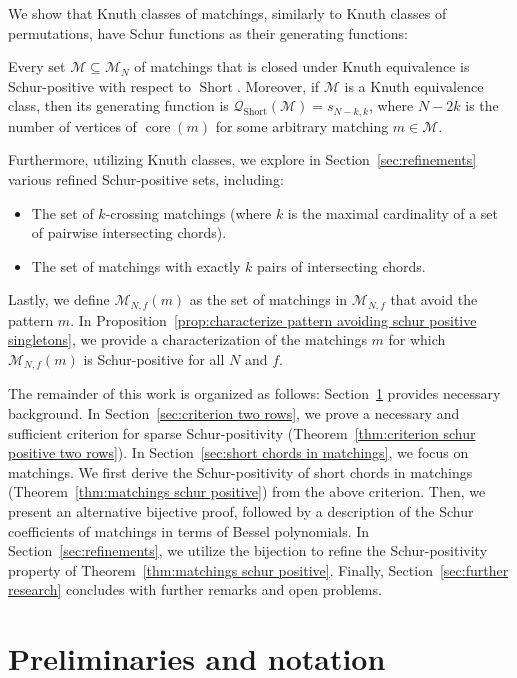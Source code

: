 \documentclass[ALCO]{cedram}
\newcommand{\Short}{\operatorname{Short}}
\newcommand{\core}{\operatorname{core}}
\newcommand{\Q}{\mathcal{Q}}
\newcommand{\M}{\mathcal{M}}
\begin{document}
We show that Knuth classes of matchings, similarly to Knuth classes of permutations, have Schur functions as their generating functions:

\begin{theorem}
    Every set $\M \subseteq \M_N$ of matchings that is closed under Knuth equivalence is Schur-positive with respect to $\Short$. Moreover, if $\M$ is a Knuth equivalence class, then its generating function is $\Q_{\Short}(\M) = s_{N-k,k}$, where $N-2k$ is the number of vertices of $\core(m)$ for some arbitrary matching $m \in \M$.
\end{theorem}

Furthermore, utilizing Knuth classes, we explore in Section~\ref{sec:refinements} various refined Schur-positive sets, including:
\begin{itemize}
    \item The set of $k$-crossing matchings (\ie where $k$ is the maximal cardinality of a set of pairwise intersecting chords).
    \item The set of matchings with exactly $k$ pairs of intersecting chords.
\end{itemize}

Lastly, we define $\M_{N,f}(m)$ as the set of matchings in $\M_{N,f}$ that avoid the pattern $m$. In Proposition~\ref{prop:characterize pattern avoiding schur positive singletons}, we provide a characterization of the matchings $m$ for which $\M_{N,f}(m)$ is Schur-positive for all $N$ and $f$.

The remainder of this work is organized as follows: Section~\ref{sec:preliminaries} provides necessary background. In Section~\ref{sec:criterion two rows}, we prove a necessary and sufficient criterion for sparse Schur-positivity (Theorem~\ref{thm:criterion schur positive two rows}). In Section~\ref{sec:short chords in matchings}, we focus on matchings. We first derive the Schur-positivity of short chords in matchings (Theorem~\ref{thm:matchings schur positive}) from the above criterion. Then, we present an alternative bijective proof, followed by a description of the Schur coefficients of matchings in terms of Bessel polynomials. In Section~\ref{sec:refinements}, we utilize the bijection to refine the Schur-positivity property of Theorem~\ref{thm:matchings schur positive}. Finally, Section~\ref{sec:further research} concludes with further remarks and open problems.

\section{Preliminaries and notation}
\label{sec:preliminaries}
\end{document}
